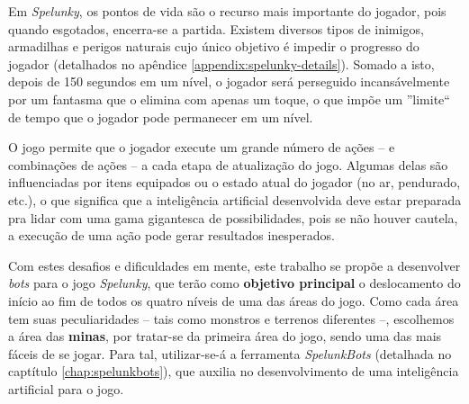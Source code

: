 Em \textit{Spelunky}, os pontos de vida são o recurso mais importante do
jogador, pois quando esgotados, encerra-se a partida. Existem diversos tipos de
inimigos, armadilhas e perigos naturais cujo único objetivo é impedir o
progresso do jogador (detalhados no apêndice \ref{appendix:spelunky-details}).
Somado a isto, depois de 150 segundos em um nível, o jogador será perseguido
incansávelmente por um fantasma que o elimina com apenas um toque, o que impõe
um ''limite`` de tempo que o jogador pode permanecer em um nível.

O jogo permite que o jogador execute um grande número de ações -- e combinações
de ações -- a cada etapa de atualização do jogo. Algumas delas são influenciadas
por itens equipados ou o estado atual do jogador (no ar, pendurado, etc.), o que
significa que a inteligência artificial desenvolvida deve estar preparada pra
lidar com uma gama gigantesca de possibilidades, pois se não houver cautela, a
execução de uma ação pode gerar resultados inesperados. 

Com estes desafios e dificuldades em mente, este trabalho se propõe a
desenvolver \textit{bots} para o jogo \textit{Spelunky}, que terão como
\textbf{objetivo principal} o deslocamento do início ao fim de todos os quatro
níveis de uma das áreas do jogo. Como cada área tem suas peculiaridades -- tais
como monstros e terrenos diferentes --, escolhemos a área das \textbf{minas},
por tratar-se da primeira área do jogo, sendo uma das mais fáceis de se jogar.
Para tal, utilizar-se-á a ferramenta \textit{SpelunkBots} (detalhada no
captítulo \ref{chap:spelunkbots}), que auxilia no desenvolvimento de uma
inteligência artificial para o jogo.
